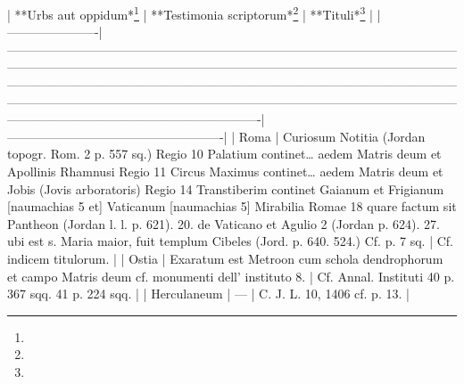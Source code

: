 \documentclass[a4paper, 11pt, oneside, polutonikogreek, german]{article}
\begin{document}
| **Urbs aut oppidum*\footnote{} | **Testimonia scriptorum*\footnote{}                                                                                                                                                                                                                                                                                                                                                                                                                                                                                   | **Tituli*\footnote{}                                         |
|----------------------|-------------------------------------------------------------------------------------------------------------------------------------------------------------------------------------------------------------------------------------------------------------------------------------------------------------------------------------------------------------------------------------------------------------------------------------------------------------------------------------------------------------|----------------------------------------------------|
| Roma                 | Curiosum Notitia (Jordan topogr. Rom. 2 p. 557 sq.) Regio 10 Palatium continet… aedem Matris deum et Apollinis Rhamnusi Regio 11 Circus Maximus continet… aedem Matris deum et Jobis (Jovis arboratoris) Regio 14 Transtiberim continet Gaianum et Frigianum [naumachias 5 et] Vaticanum [naumachias 5] Mirabilia Romae 18 quare factum sit Pantheon (Jordan l. l. p. 621). 20. de Vaticano et Agulio 2 (Jordan p. 624). 27. ubi est s. Maria maior, fuit templum Cibeles (Jord. p. 640. 524.) Cf. p. 7 sq. | Cf. indicem titulorum.                             |
| Ostia                | Exaratum est Metroon cum schola dendrophorum et campo Matris deum cf. monumenti dell’ instituto 8.                                                                                                                                                                                                                                                                                                                                                                                                          | Cf. Annal. Instituti 40 p. 367 sqq. 41 p. 224 sqq. |
| Herculaneum          | ---                                                                                                                                                                                                                                                                                                                                                                                                                                                                                                         | C. J. L. 10, 1406 cf. p. 13.                       |
\end{document}
